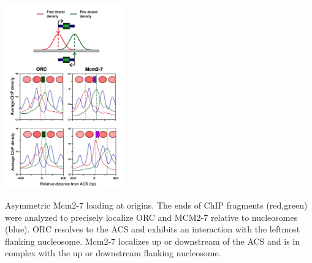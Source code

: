 \begin{floatingfigure}[r]{2.0in}
\vspace{-8mm}
\begin{center}
\includegraphics[width=2.0in]{r35_figures/mcm_histone.png}
\end{center}
\vspace{3mm}
\caption{Asymmetric Mcm2-7 loading at origins.  The ends of ChIP fragments (red,green) were analyzed to precisely localize ORC and MCM2-7 relative to nucleosomes (blue).  ORC resolves to the ACS and exhibits an interaction with the leftmost flanking nucleosome.  Mcm2-7 localizes up or downstream of the ACS and is in complex with the up or downstream flanking nucleosome.}%
\end{floatingfigure}%



